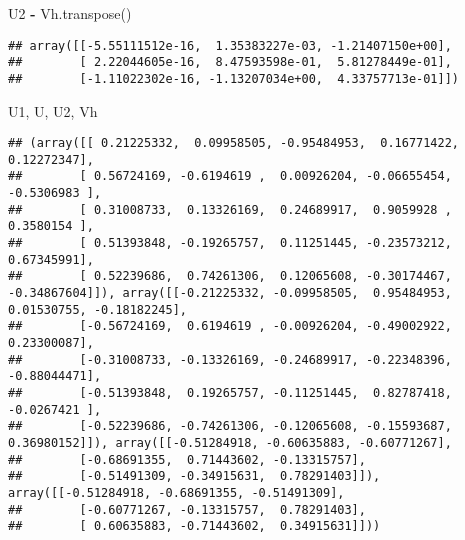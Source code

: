 \documentclass[]{article}
\newenvironment{Shaded}{\begin{snugshade}}{\end{snugshade}}
\newcommand{\NormalTok}[1]{#1}
\newcommand{\OperatorTok}[1]{\textcolor[rgb]{0.81,0.36,0.00}{\textbf{#1}}}
\begin{document}
\begin{Shaded}
\begin{Highlighting}[]
\NormalTok{U2 }\OperatorTok{-}\NormalTok{ Vh.transpose()}
\end{Highlighting}
\end{Shaded}

\begin{verbatim}
## array([[-5.55111512e-16,  1.35383227e-03, -1.21407150e+00],
##        [ 2.22044605e-16,  8.47593598e-01,  5.81278449e-01],
##        [-1.11022302e-16, -1.13207034e+00,  4.33757713e-01]])
\end{verbatim}

\begin{Shaded}
\begin{Highlighting}[]
\NormalTok{U1, U, U2, Vh}
\end{Highlighting}
\end{Shaded}

\begin{verbatim}
## (array([[ 0.21225332,  0.09958505, -0.95484953,  0.16771422,  0.12272347],
##        [ 0.56724169, -0.6194619 ,  0.00926204, -0.06655454, -0.5306983 ],
##        [ 0.31008733,  0.13326169,  0.24689917,  0.9059928 ,  0.3580154 ],
##        [ 0.51393848, -0.19265757,  0.11251445, -0.23573212,  0.67345991],
##        [ 0.52239686,  0.74261306,  0.12065608, -0.30174467, -0.34867604]]), array([[-0.21225332, -0.09958505,  0.95484953,  0.01530755, -0.18182245],
##        [-0.56724169,  0.6194619 , -0.00926204, -0.49002922,  0.23300087],
##        [-0.31008733, -0.13326169, -0.24689917, -0.22348396, -0.88044471],
##        [-0.51393848,  0.19265757, -0.11251445,  0.82787418, -0.0267421 ],
##        [-0.52239686, -0.74261306, -0.12065608, -0.15593687,  0.36980152]]), array([[-0.51284918, -0.60635883, -0.60771267],
##        [-0.68691355,  0.71443602, -0.13315757],
##        [-0.51491309, -0.34915631,  0.78291403]]), array([[-0.51284918, -0.68691355, -0.51491309],
##        [-0.60771267, -0.13315757,  0.78291403],
##        [ 0.60635883, -0.71443602,  0.34915631]]))
\end{verbatim}
\end{document}
